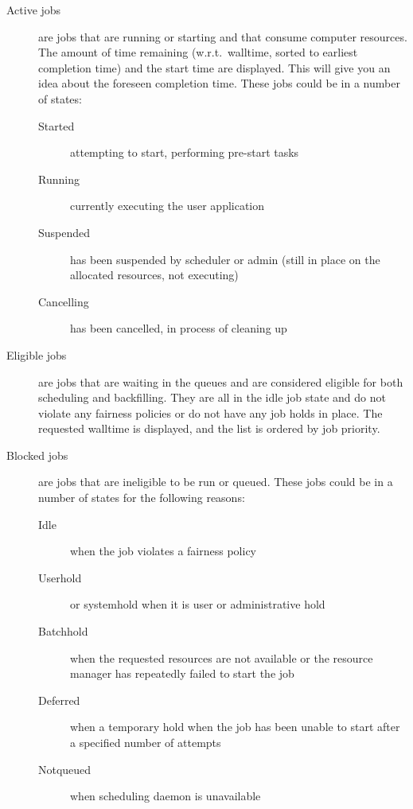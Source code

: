   \begin{description}
    \item[Active jobs] are jobs that are running or starting and that consume computer resources. The amount of time remaining (w.r.t.\ walltime, sorted to earliest completion time) and the start time are displayed. This will give you an idea about the foreseen completion time. These jobs could be in a number of states:

    \begin{description}
      \item[Started] attempting to start, performing pre-start tasks
      \item[Running] currently executing the user application
      \item[Suspended] has been suspended by scheduler or admin (still in place
        on the allocated resources, not executing)
      \item[Cancelling] has been cancelled, in process of cleaning up
    \end{description}

    \item[Eligible jobs] are jobs that are waiting in the queues and are
      considered eligible for both scheduling and backfilling.  They are all in
      the idle job state and do not violate any fairness policies or do not have
      any job holds in place. The requested walltime is displayed, and the list
      is ordered by job priority.
    \item[Blocked jobs] are jobs that are ineligible to be run or queued.  These
      jobs could be in a number of states for the following reasons:

    \begin{description}
      \item[Idle] when the job violates a fairness policy
      \item[Userhold] or systemhold when it is user or administrative hold
      \item[Batchhold] when the requested resources are not available or the resource manager has repeatedly failed to start the job
      \item[Deferred] when a temporary hold when the job has been unable to start after a specified number of attempts
      \item[Notqueued] when scheduling daemon is unavailable
    \end{description}
  \end{description}
\fi

